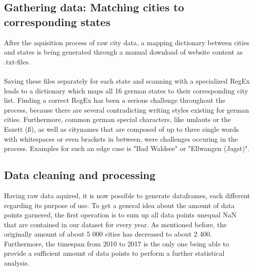 \documentclass{article}
\begin{document}
\subsection{Gathering data: Matching cities to corresponding states}
	After the aquisition process of raw city data, a mapping dictionary between cities and states is being generated through a manual download of website content as .txt-files. \cite{rental_prices_states}\\\\
	Saving these files separately for each state and scanning with a specialized RegEx leads to a dictionary which maps all 16 german states to their corresponding city list. Finding a correct RegEx has been a serious challenge throughout the process, because there are several contradicting writing styles existing for german cities. Furthermore, common german special characters, like umlauts or the Eszett (ß), as well as citynames that are composed of up to three single words with whitespaces or even brackets in between, were challenges occuring in the process. Examples for such an edge case is "Bad Waldsee" or "Ellwangen (Jagst)".

\subsection{Data cleaning and processing}
	Having raw data aquired, it is now possible to generate dataframes, each different regarding its purpose of use. To get a general idea about the amount of data points garnered, the first operation is to sum up all data points unequal NaN that are contained in our dataset for every year. As mentioned before, the originally amount of about 5 000 cities has decreased to about 2 400. Furthermore, the timespan  from 2010 to 2017 is the only one being able to provide a sufficient amount of data points to perform a further statistical analysis.
\end{document}
